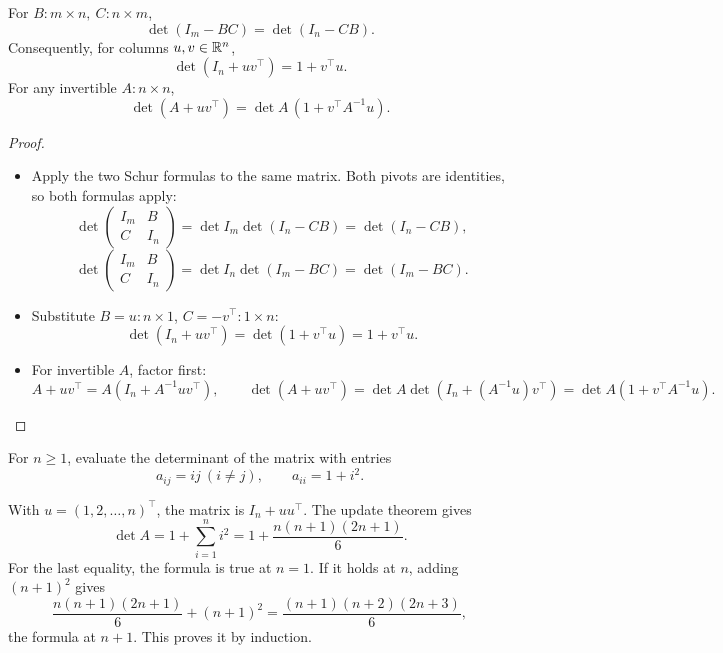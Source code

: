 \begin{theorem}\label{thm:05:update}
For \(B:m\times n,\ C:n\times m\),
\[
\det(I_m-BC)=\det(I_n-CB).
\]
Consequently, for columns \(u,v\in\mathbb R^n\),
\[
\det(I_n+uv^\top)=1+v^\top u.
\]
For any invertible \(A:n\times n\),
\[
\det(A+uv^\top)=\det A\,(1+v^\top A^{-1}u).
\]
\end{theorem}
\begin{proof}
\begin{itemize}
\item Apply the two Schur formulas to the same matrix. Both pivots are
  identities, so both formulas apply:
  \[
  \det\begin{pmatrix}I_m&B\\C&I_n\end{pmatrix}
   =\det I_m\det(I_n-CB)=\det(I_n-CB),
  \]
  \[
  \det\begin{pmatrix}I_m&B\\C&I_n\end{pmatrix}
   =\det I_n\det(I_m-BC)=\det(I_m-BC).
  \]
\item Substitute \(B=u:n\times1\), \(C=-v^\top:1\times n\):
  \[
  \det(I_n+uv^\top)=\det(1+v^\top u)=1+v^\top u.
  \]
\item For invertible \(A\), factor first:
  \[
  A+uv^\top=A(I_n+A^{-1}uv^\top),\qquad
  \det(A+uv^\top)=\det A\det(I_n+(A^{-1}u)v^\top)
               =\det A(1+v^\top A^{-1}u).
  \]
\end{itemize}
\end{proof}

\begin{example}\label{example:05:bapat-update}
For \(n\geqslant1\), evaluate the determinant of the matrix with entries
\[
a_{ij}=ij\ (i\ne j),\qquad a_{ii}=1+i^2.
\]
\par\smallskip
{}
With \(u=(1,2,\ldots,n)^\top\), the matrix is \(I_n+uu^\top\).
The update theorem gives
\[
\det A=1+\sum_{i=1}^n i^2=1+\frac{n(n+1)(2n+1)}6.
\]
For the last equality, the formula is true at \(n=1\).
If it holds at \(n\), adding \((n+1)^2\) gives
\[
\frac{n(n+1)(2n+1)}6+(n+1)^2
=\frac{(n+1)(n+2)(2n+3)}6,
\]
the formula at \(n+1\). This proves it by induction.
\end{example}

